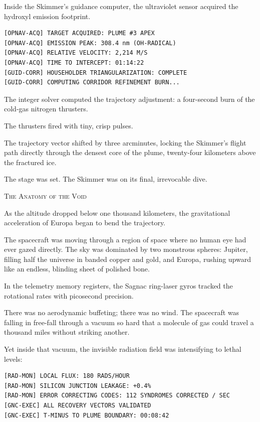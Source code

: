 \documentclass[12pt,twoside,openright]{book}
\newcommand{\sceneheader}[1]{%
  \par\vspace{1.8em}%
  {\noindent\centering\scshape\large #1\par}%
  \vspace{1.0em}%
  \noindent%
}
\newcommand{\dinkus}{%
  \par\vspace{1.2em}%
  {\noindent\centering{\large $\ast\quad\ast\quad\ast$}\par}%
  \vspace{1.2em}%
  \noindent%
}
\begin{document}
Inside the Skimmer's guidance computer, the ultraviolet sensor acquired
the hydroxyl emission footprint.

\begin{lstlisting}
[OPNAV-ACQ] TARGET ACQUIRED: PLUME #3 APEX
[OPNAV-ACQ] EMISSION PEAK: 308.4 nm (OH-RADICAL)
[OPNAV-ACQ] RELATIVE VELOCITY: 2,214 M/S
[OPNAV-ACQ] TIME TO INTERCEPT: 01:14:22
[GUID-CORR] HOUSEHOLDER TRIANGULARIZATION: COMPLETE
[GUID-CORR] COMPUTING CORRIDOR REFINEMENT BURN...
\end{lstlisting}

The integer solver computed the trajectory adjustment: a four-second
burn of the cold-gas nitrogen thrusters.

The thrusters fired with tiny, crisp pulses.

The trajectory vector shifted by three arcminutes, locking the Skimmer's
flight path directly through the densest core of the plume, twenty-four
kilometers above the fractured ice.

The stage was set. The Skimmer was on its final, irrevocable dive.

\dinkus

\sceneheader{The Anatomy of the Void}

As the altitude dropped below one thousand kilometers, the gravitational
acceleration of Europa began to bend the trajectory.

The spacecraft was moving through a region of space where no human eye
had ever gazed directly. The sky was dominated by two monstrous spheres:
Jupiter, filling half the universe in banded copper and gold, and
Europa, rushing upward like an endless, blinding sheet of polished bone.

In the telemetry memory registers, the Sagnac ring-laser gyros tracked
the rotational rates with picosecond precision.

There was no aerodynamic buffeting; there was no wind. The spacecraft
was falling in free-fall through a vacuum so hard that a molecule of gas
could travel a thousand miles without striking another.

Yet inside that vacuum, the invisible radiation field was intensifying
to lethal levels:

\begin{lstlisting}
[RAD-MON] LOCAL FLUX: 180 RADS/HOUR
[RAD-MON] SILICON JUNCTION LEAKAGE: +0.4%
[RAD-MON] ERROR CORRECTING CODES: 112 SYNDROMES CORRECTED / SEC
[GNC-EXEC] ALL RECOVERY VECTORS VALIDATED
[GNC-EXEC] T-MINUS TO PLUME BOUNDARY: 00:08:42
\end{lstlisting}
\end{document}
